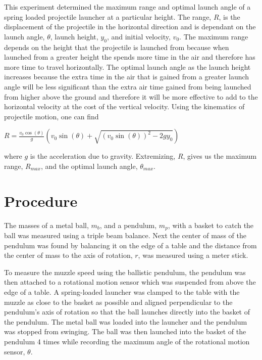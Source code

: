 \documentclass[12pt]{article}
\begin{document}
        This experiment determined the maximum range and optimal launch angle of a spring loaded projectile launcher at a 
        particular height. The range, $R$, is the displacement of the projectile in the horizontal direction and is dependant on the launch angle, $\theta$, launch height, $y_0$, and initial velocity, $v_0$.  The maximum range depends on the height that the projectile is launched from because when launched from a greater height the  spends more time in the air and therefore has more time to travel horizontally. The optimal launch angle  as the launch height increases because the extra time in the air that is gained from a greater launch angle will be less significant than the extra air time gained from being launched from higher above the ground and therefore it will be more effective to add to the horizontal velocity at the cost of the vertical velocity. Using the kinematics of projectile motion, one can find
        \begin{center}
            \(R = \frac{v_0 \cos(\theta)}{g}\left(v_0 \sin(\theta) +\sqrt{(v_0 \sin(\theta))^2-2gy_{0}}\right)\)
        \end{center}
        where \(g\) is the acceleration due to gravity. Extremizing, $R$, gives us the maximum range, $R_{max}$, and the optimal launch angle, $\theta_{max}$. 
    \section{Procedure}
        The masses of a metal ball, \(m_b\), and a pendulum, \(m_p\), with a basket to catch the ball was measured using a triple beam balance. Next the center of mass of the pendulum was found by balancing it on the edge of a table and the distance from the center of mass to the axis of rotation, \(r\), was measured using a meter stick. 
        
        To measure the muzzle speed using the ballistic pendulum, the pendulum was then attached to a rotational motion sensor which was suspended from above the edge of a table. A spring-loaded launcher was clamped to the table with the muzzle as close to the basket as possible and aligned perpendicular to the pendulum's axis of rotation so that the ball launches directly into the basket of the pendulum. The metal ball was loaded into the launcher and the pendulum was stopped from swinging. The ball was then launched into the basket of the pendulum 4 times while recording the maximum angle of the rotational motion sensor, \(\theta\). 
\end{document}
